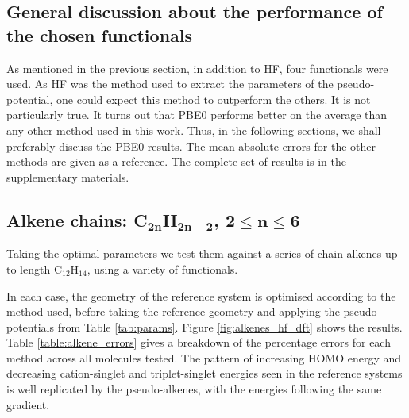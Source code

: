 \documentclass[aip]{revtex4-1}
\begin{document}
\subsection{General discussion about the performance of the chosen functionals}
As mentioned in the previous section, in addition to HF, four functionals were used.
As HF was the method used to extract the parameters of the pseudo-potential, one could expect
this method to outperform the others.
It is not particularly true.
It turns out that PBE0 performs better on the average than any other method used in this work.
Thus, in the following sections, we shall preferably discuss the PBE0 results.
The mean absolute errors for the other methods are given as a reference.
The complete set of results is in the supplementary materials.

\subsection{Alkene chains: C\(\mathbf{_{2n}}\)H\(\mathbf{_{2n+2}}\), \(\mathbf{2 \leq n \leq 6}\)}

Taking the optimal parameters we test them against a series of chain alkenes up to
length C\(_{12}\)H\(_{14}\), using a variety of functionals.

In each case, the geometry of the reference system is optimised according to the method used,
before taking the reference geometry and applying the pseudo-potentials from Table \ref{tab:params}.
Figure \ref{fig:alkenes_hf_dft} shows the results.
Table \ref{table:alkene_errors} gives a breakdown of the percentage errors for each method
across all molecules tested.
The pattern of increasing HOMO energy and decreasing cation-singlet and triplet-singlet
energies seen in the reference systems is well replicated by the pseudo-alkenes,
with the energies following the same gradient.
\end{document}
